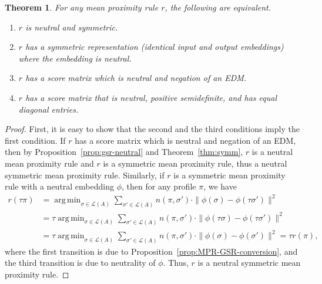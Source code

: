 \documentclass[10pt,letterpaper]{article}
\newcommand{\calL}{{\mathcal{L}}}
\newcommand{\rank}{{\calL(A)}}
\DeclareMathOperator*{\argmin}{arg\,min}
\newtheorem{theorem}{Theorem}
\begin{document}
\begin{theorem}
For any mean proximity rule $r$, the following are equivalent.
\begin{enumerate}
\item $r$ is neutral and symmetric.
\item $r$ has a symmetric representation (identical input and output embeddings) where the embedding is neutral.
\item $r$ has a score matrix which is neutral and negation of an EDM. 
\item $r$ has a score matrix that is neutral, positive semidefinite, and has equal diagonal entries.
\end{enumerate}
\label{thm:neutral-smpr}
\end{theorem}
\begin{proof}
First, it is easy to show that the second and the third conditions imply the first condition. If $r$ has a score matrix which is neutral and negation of an EDM, then by Proposition~\ref{prop:gsr-neutral} and Theorem~\ref{thm:symm}, $r$ is a neutral mean proximity rule and $r$ is a symmetric mean proximity rule, thus a neutral symmetric mean proximity rule. Similarly, if $r$ is a symmetric mean proximity rule with a neutral embedding $\phi$, then for any profile $\pi$, we have 
\begin{align*}
r(\tau \pi) &= \argmin_{\sigma \in \rank} \sum_{\sigma' \in \rank} n(\pi,\sigma') \cdot \|\phi(\sigma)-\phi(\tau \sigma')\|^2 \\
&= \tau \argmin_{\sigma \in \rank} \sum_{\sigma' \in \rank} n(\pi,\sigma') \cdot \|\phi(\tau \sigma)-\phi(\tau \sigma')\|^2 \\
&= \tau \argmin_{\sigma \in \rank} \sum_{\sigma' \in \rank} n(\pi,\sigma') \cdot \|\phi(\sigma)-\phi(\sigma')\|^2 = \tau r(\pi),
\end{align*}
where the first transition is due to Proposition~\ref{prop:MPR-GSR-conversion}, and the third transition is due to neutrality of $\phi$. Thus, $r$ is a neutral symmetric mean proximity rule. 


\end{proof}
\end{document}

